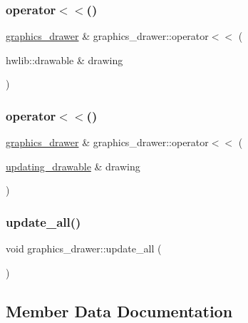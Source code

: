 \subsubsection{\texorpdfstring{operator$<$$<$()}{operator<<()}\hspace{0.1cm}{\footnotesize\ttfamily [1/2]}}
{\footnotesize\ttfamily \hyperlink{classgraphics__drawer}{graphics\+\_\+drawer} \& graphics\+\_\+drawer\+::operator$<$$<$ (\begin{DoxyParamCaption}\item[{hwlib\+::drawable \&}]{drawing }\end{DoxyParamCaption})}

\mbox{\label{classgraphics__drawer_a034d8e5bff49f5f18d17eb4d581712f2}} 
\subsubsection{\texorpdfstring{operator$<$$<$()}{operator<<()}\hspace{0.1cm}{\footnotesize\ttfamily [2/2]}}
{\footnotesize\ttfamily \hyperlink{classgraphics__drawer}{graphics\+\_\+drawer} \& graphics\+\_\+drawer\+::operator$<$$<$ (\begin{DoxyParamCaption}\item[{\hyperlink{classupdating__drawable}{updating\+\_\+drawable} \&}]{drawing }\end{DoxyParamCaption})}

\mbox{\label{classgraphics__drawer_ac85a6dc3e0ef97fc793f91862e794c47}} 
\subsubsection{\texorpdfstring{update\+\_\+all()}{update\_all()}}
{\footnotesize\ttfamily void graphics\+\_\+drawer\+::update\+\_\+all (\begin{DoxyParamCaption}{ }\end{DoxyParamCaption})}



\subsection{Member Data Documentation}
\mbox{\label{classgraphics__drawer_ae6341a415f308d7d276d6c36336f2888}} 
